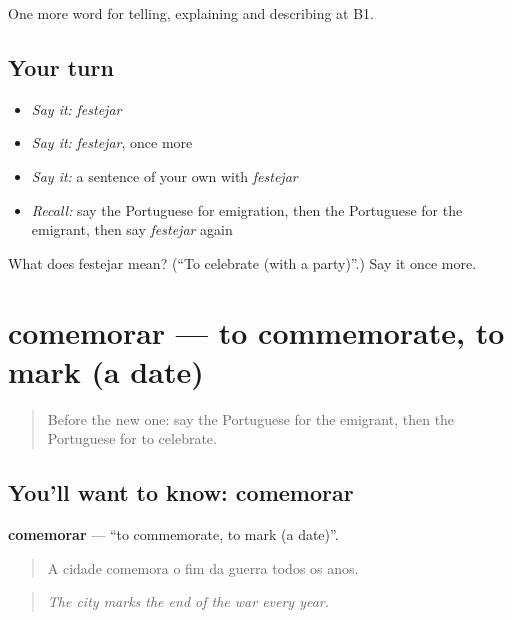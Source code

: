 \begin{grammarlens}[title={What you've built}]
One more word for telling, explaining and describing at B1.
\end{grammarlens}

\subsection*{Your turn}
\begin{itemize}
\raggedright
  \item \emph{Say it:} \emph{festejar}
  \item \emph{Say it:} \emph{festejar}, once more
  \item \emph{Say it:} a sentence of your own with \emph{festejar}
  \item \emph{Recall:} say the Portuguese for emigration, then the Portuguese for the emigrant, then say \emph{festejar} again
\end{itemize}

\begin{tcolorbox}[breakable,colback=teal!4,colframe=teal!35!black,title={Before you move on}]
What does festejar mean? (\textquotedblleft{}To celebrate (with a party)\textquotedblright{}.) Say it once more.
\end{tcolorbox}
\section[comemorar]{comemorar — to commemorate, to mark (a date)}

\label{lesson:PT-C318-comemorar}



\begin{quote}
Before the new one: say the Portuguese for the emigrant, then the Portuguese for to celebrate.
\end{quote}

\subsection*{You'll want to know: comemorar}
\textbf{comemorar} — \textquotedblleft{}to commemorate, to mark (a date)\textquotedblright{}.

\begin{quote}
A cidade comemora o fim da guerra todos os anos.
\end{quote}

\begin{quote}
\emph{The city marks the end of the war every year.}
\end{quote}

